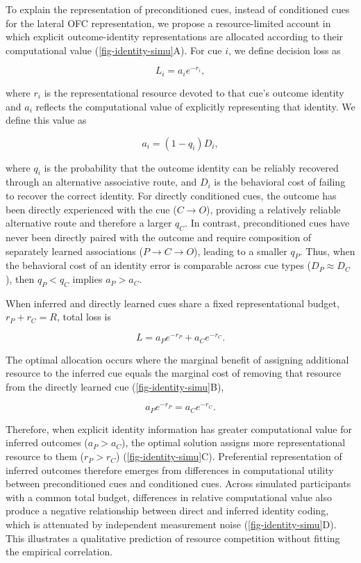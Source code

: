 \documentclass[12pt,letterpaper]{article}
\begin{document}
To explain the representation of preconditioned cues, instead of conditioned cues for the lateral OFC representation, we propose a resource-limited account in which explicit outcome-identity representations are allocated according to their computational value (\autoref{fig-identity-simu}A). For cue $i$, we define decision loss as


\begin{equation}
L_i = a_i e^{-r_i},
\end{equation}

where $r_i$ is the representational resource devoted to that cue's outcome identity and $a_i$ reflects the computational value of explicitly representing that identity. We define this value as

\begin{equation}
a_i = (1-q_i) D_i,
\end{equation}

where $q_i$ is the probability that the outcome identity can be reliably recovered through an alternative associative route, and $D_i$ is the behavioral cost of failing to recover the correct identity. For directly conditioned cues, the outcome has been directly experienced with the cue ($C \rightarrow O$), providing a relatively reliable alternative route and therefore a larger $q_C$. In contrast, preconditioned cues have never been directly paired with the outcome and require composition of separately learned associations ($P \rightarrow C \rightarrow O$), leading to a smaller $q_P$. Thus, when the behavioral cost of an identity error is comparable across cue types ($D_P \approx D_C$), then $q_P < q_C$ implies $a_P > a_C$.

When inferred and directly learned cues share a fixed representational budget,
$r_P + r_C = R$, total loss is

\begin{equation}
L = a_P e^{-r_P} + a_C e^{-r_C}.
\end{equation}

The optimal allocation occurs where the marginal benefit of assigning additional resource to the inferred cue equals the marginal cost of removing that resource from the directly learned cue (\autoref{fig-identity-simu}B),

\begin{equation}
a_P e^{-r_P} = a_C e^{-r_C}.
\end{equation}

Therefore, when explicit identity information has greater computational value for inferred outcomes ($a_P > a_C$), the optimal solution assigns more representational resource to them ($r_P > r_C$) (\autoref{fig-identity-simu}C). Preferential representation of inferred outcomes therefore emerges from differences in computational utility between preconditioned cues and conditioned cues. Across simulated participants with a common total budget, differences in relative computational value also produce a negative relationship between direct and inferred identity coding, which is attenuated by independent measurement noise (\autoref{fig-identity-simu}D). This illustrates a qualitative prediction of resource competition without fitting the empirical correlation.
\end{document}
